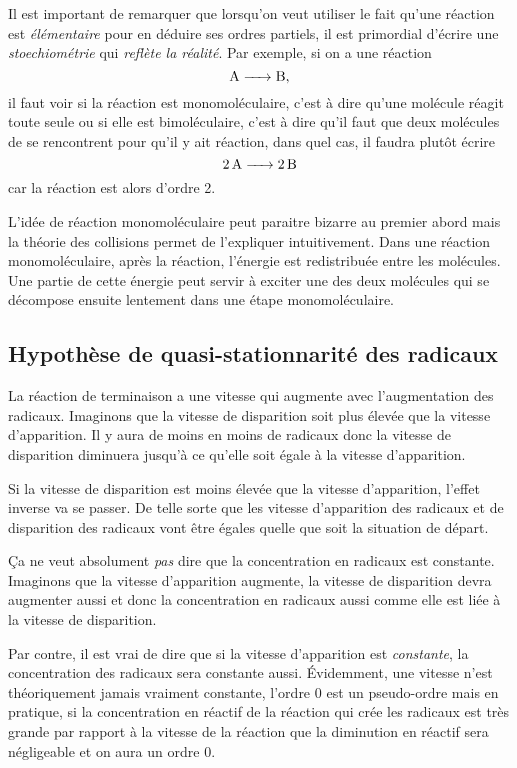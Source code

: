 \begin{myrem}
  Il est important de remarquer que lorsqu'on veut utiliser
  le fait qu'une réaction est \emph{élémentaire} pour en déduire ses
  ordres partiels, il est primordial d'écrire une \emph{stoechiométrie}
  qui \emph{reflète la réalité}.
  Par exemple, si on a une réaction
  \[ \ce{A -> B}, \]
  il faut voir si la réaction est monomoléculaire, c'est à dire qu'une
  molécule  réagit toute seule ou si elle est bimoléculaire,
  c'est à dire qu'il faut que deux molécules de  se rencontrent
  pour qu'il y ait réaction,
  dans quel cas, il faudra plutôt écrire
  \[ \ce{2A -> 2B} \]
  car la réaction est alors d'ordre 2.

  L'idée de réaction monomoléculaire peut paraitre bizarre au premier
  abord mais la théorie des collisions permet de l'expliquer intuitivement.
  Dans une réaction monomoléculaire, après la réaction,
  l'énergie est redistribuée entre les molécules.
  Une partie de cette énergie peut servir à exciter une des deux molécules qui
  se décompose ensuite lentement dans une étape monomoléculaire.
\end{myrem}

\subsection{Hypothèse de quasi-stationnarité des radicaux}
La réaction de terminaison a une vitesse qui augmente avec l'augmentation
des radicaux.
Imaginons que la vitesse de disparition soit plus élevée que la vitesse
d'apparition. Il y aura de moins en moins de radicaux donc la vitesse
de disparition diminuera jusqu'à ce qu'elle soit égale à
la vitesse d'apparition.

Si la vitesse de disparition est moins élevée que la vitesse
d'apparition, l'effet inverse va se passer.
De telle sorte que les vitesse d'apparition des radicaux et de disparition
des radicaux vont être égales quelle que soit la situation de départ.

\begin{myrem}
  Ça ne veut absolument \emph{pas} dire
  que la concentration en radicaux est constante.
  Imaginons que la vitesse d'apparition augmente, la vitesse
  de disparition devra augmenter aussi et donc la concentration en
  radicaux aussi comme elle est liée à la vitesse de disparition.

  Par contre, il est vrai de dire que si la vitesse d'apparition
  est \emph{constante}, la concentration des radicaux sera constante aussi.
  Évidemment, une vitesse n'est théoriquement jamais vraiment constante,
  l'ordre 0 est un pseudo-ordre mais en pratique,
  si la concentration en réactif de la réaction qui crée les radicaux
  est très grande par rapport à la vitesse de la réaction que la
  diminution en réactif sera négligeable et on aura un ordre 0.
\end{myrem}

